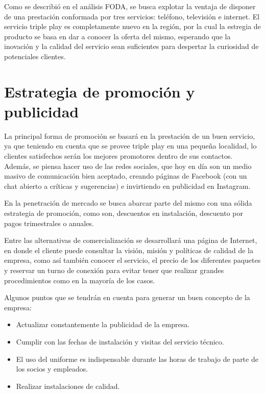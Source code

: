 \documentclass[12pt,a4paper]{book}
\begin{document}
Como se describió en el análisis FODA, se busca explotar la ventaja de disponer de una prestación conformada por tres servicios: teléfono, televisión e internet. El servicio triple play es completamente nuevo en la región, por la cual la estregia de producto se basa en dar a conocer la oferta del mismo, esperando que la inovación y la calidad del servicio sean suficientes para despertar la curiosidad de potenciales clientes.

\section{Estrategia de promoción y publicidad}\label{sec_estrategia_publicidad_Pnegocio}

La principal forma de promoción se basará en la prestación de un buen servicio, ya que teniendo en cuenta que se provee triple play en una pequeña localidad, lo clientes satisfechos serán los mejores promotores dentro de sus contactos. Además, se piensa hacer uso de las redes sociales, que hoy en día son un medio masivo de comunicación bien aceptado, creando páginas de Facebook (con un chat abierto a críticas y sugerencias) e  invirtiendo en publicidad en Instagram. 

En la penetración de mercado se busca abarcar parte del mismo con una sólida estrategia de promoción, como son, descuentos en instalación, descuento por pagos trimestrales o anuales.

Entre las alternativas de comercialización se desarrollará una página de Internet, en donde el cliente puede consultar la visión, misión y políticas de calidad de la empresa, como así también conocer el servicio, el precio de los diferentes paquetes y reservar un turno de conexión para evitar tener que realizar grandes procedimientos como en la mayoría de los casos.

Algunos puntos que se tendrán en cuenta para generar un buen concepto de la empresa:

\begin{itemize}
\item Actualizar constantemente la publicidad de la empresa.
\item Cumplir con las fechas de instalación y visitas del servicio técnico.
\item El uso del uniforme es indispensable durante las horas de trabajo de parte de los socios y empleados.
\item Realizar instalaciones de calidad.
\end{itemize}
\end{document}
